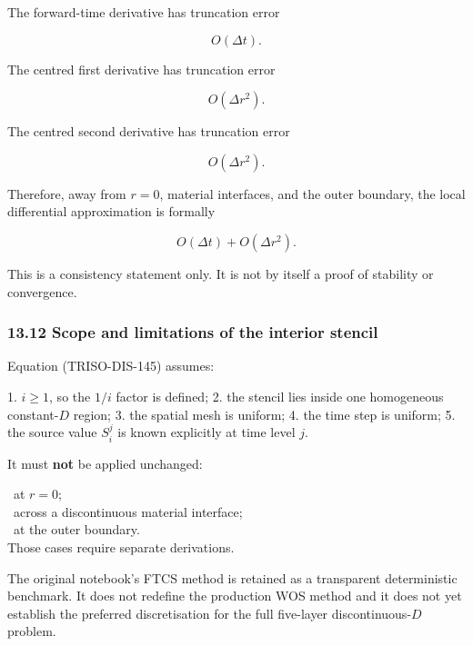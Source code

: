 \documentclass[11pt,a4paper]{article}
\begin{document}
The forward-time derivative has truncation error

\begin{equation}
O(\Delta t).
\tag{TRISO-DIS-149}
\label{eq:triso-dis-149}
\end{equation}

The centred first derivative has truncation error

\begin{equation}
O(\Delta r^2).
\tag{TRISO-DIS-150}
\label{eq:triso-dis-150}
\end{equation}

The centred second derivative has truncation error

\begin{equation}
O(\Delta r^2).
\tag{TRISO-DIS-151}
\label{eq:triso-dis-151}
\end{equation}

Therefore, away from $r=0$, material interfaces, and the outer boundary, the local differential approximation is formally

\begin{equation}
\boxed{
O(\Delta t)+O(\Delta r^2).
}
\tag{TRISO-DIS-152}
\label{eq:triso-dis-152}
\end{equation}

This is a consistency statement only. It is not by itself a proof of stability or convergence.

\subsubsection*{13.12 Scope and limitations of the interior stencil}

Equation (TRISO-DIS-145) assumes:

1. $i\ge1$, so the $1/i$ factor is defined;
2. the stencil lies inside one homogeneous constant-$D$ region;
3. the spatial mesh is uniform;
4. the time step is uniform;
5. the source value $S_i^j$ is known explicitly at time level $j$.

It must \textbf{not} be applied unchanged:

\noindent\textbullet\ at $r=0$;\\
\noindent\textbullet\ across a discontinuous material interface;\\
\noindent\textbullet\ at the outer boundary.\\

Those cases require separate derivations.

The original notebook's FTCS method is retained as a transparent deterministic benchmark. It does not redefine the production WOS method and it does not yet establish the preferred discretisation for the full five-layer discontinuous-$D$ problem.
\end{document}
